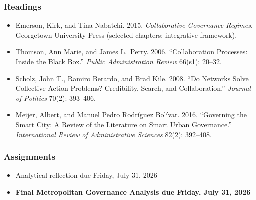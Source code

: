 \documentclass[12pt]{article}
\begin{document}
    \subsubsection*{Readings}
        \begin{itemize}
            \item Emerson, Kirk, and Tina Nabatchi. 2015. \emph{Collaborative Governance Regimes}. Georgetown University Press (selected chapters; integrative framework).
            \item Thomson, Ann Marie, and James L.\ Perry. 2006. ``Collaboration Processes: Inside the Black Box.'' \emph{Public Administration Review} 66(s1): 20--32.
            \item Scholz, John T., Ramiro Berardo, and Brad Kile. 2008. ``Do Networks Solve Collective Action Problems? Credibility, Search, and Collaboration.'' \emph{Journal of Politics} 70(2): 393--406.
            \item Meijer, Albert, and Manuel Pedro Rodr\'iguez Bol\'ivar. 2016. ``Governing the Smart City: A Review of the Literature on Smart Urban Governance.'' \emph{International Review of Administrative Sciences} 82(2): 392--408.
        \end{itemize}
    \subsubsection*{Assignments}
        \begin{itemize}
            \item Analytical reflection due Friday, July 31, 2026
            \item \textbf{Final Metropolitan Governance Analysis due Friday, July 31, 2026}
        \end{itemize}
\end{document}
